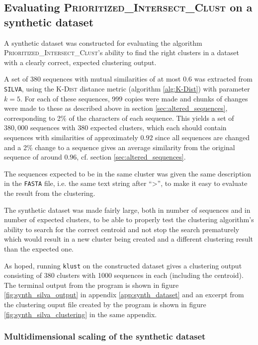 \subsection{Evaluating \textsc{Prioritized\_Intersect\_Clust} on a synthetic
  dataset} \label{sec:synth_dataset}

A synthetic dataset was constructed for evaluating the algorithm
\textsc{Prioritized\_Intersect\_Clust}'s ability to find the right clusters in
a dataset with a clearly correct, expected clustering output.

A set of 380 sequences with mutual similarities of at most 0.6 was extracted
from \texttt{SILVA}, using the \textsc{K-Dist} distance metric (algorithm
\ref{alg:K-Dist}) with parameter $k=5$. For each of these sequences, 999 copies
were made and chunks of changes were made to these as described above in
section \ref{sec:altered_sequences}, corresponding to 2\% of the characters of
each sequence. This yields a set of $380,000$ sequences with 380 expected
clusters, which each should contain sequences with similarities of
approximately $0.92$ since all sequences are changed and a 2\% change to a
sequence gives an average similarity from the original sequence of around
$0.96$, cf. section \ref{sec:altered_sequences}.

The sequences expected to be in the same cluster was given the same description
in the \texttt{FASTA} file, i.e. the same text string after ``>'', to make it
easy to evaluate the result from the clustering.

The synthetic dataset was made fairly large, both in number of sequences and in
number of expected clusters, to be able to properly test the clustering
algorithm's ability to search for the correct centroid and not stop the search
prematurely which would result in a new cluster being created and a different
clustering result than the expected one.

As hoped, running \texttt{klust} on the constructed dataset gives a clustering
output consisting of 380 clusters with 1000 sequences in each (including the
centroid). The terminal output from the program is shown in figure
\ref{fig:synth_silva_output} in appendix \ref{app:synth_dataset} and an excerpt
from the clustering ouput file created by the program is shown in figure
\ref{fig:synth_silva_clustering} in the same appendix.


\subsubsection{Multidimensional scaling of the synthetic dataset}

